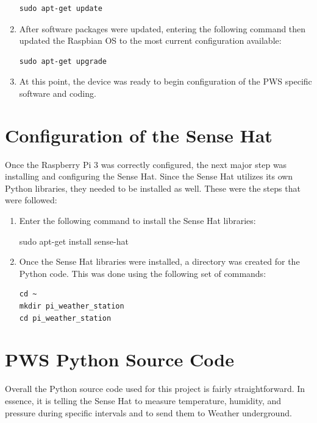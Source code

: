 \documentclass[sigconf]{acmart}
\begin{document}
\begin{enumerate}
\begin{code}
\begin{verbatim}
sudo apt-get update
\end{verbatim}
\end{code}
\item After software packages were updated, entering the following command then updated the Raspbian OS to the most current configuration available:
\begin{code}
\begin{verbatim}
sudo apt-get upgrade
\end{verbatim}
\end{code}
\item At this point, the device was ready to begin configuration of the PWS specific software and coding.
\end{enumerate}

\section{Configuration of the Sense Hat}

Once the Raspberry Pi 3 was correctly configured, the next major step was installing and configuring the Sense Hat. Since the Sense Hat utilizes its own Python libraries, they needed to be installed as well. These were the steps that were followed:

\begin{enumerate}
\item Enter the following command to install the Sense Hat libraries:
\begin{code}
sudo apt-get install sense-hat
\end{code}
\item Once the Sense Hat libraries were installed, a directory was created for the Python code. This was done using the following set of commands:
\begin{code}
\begin{verbatim}
cd ~
mkdir pi_weather_station
cd pi_weather_station
\end{verbatim}
\end{code}
\end{enumerate}

\section{PWS Python Source Code}

Overall the Python source code used for this project is fairly straightforward\cite{WundergroundPython2017}. In essence, it is telling the Sense Hat to measure temperature, humidity, and pressure during specific intervals and to send them to Weather underground. 
\end{document}

